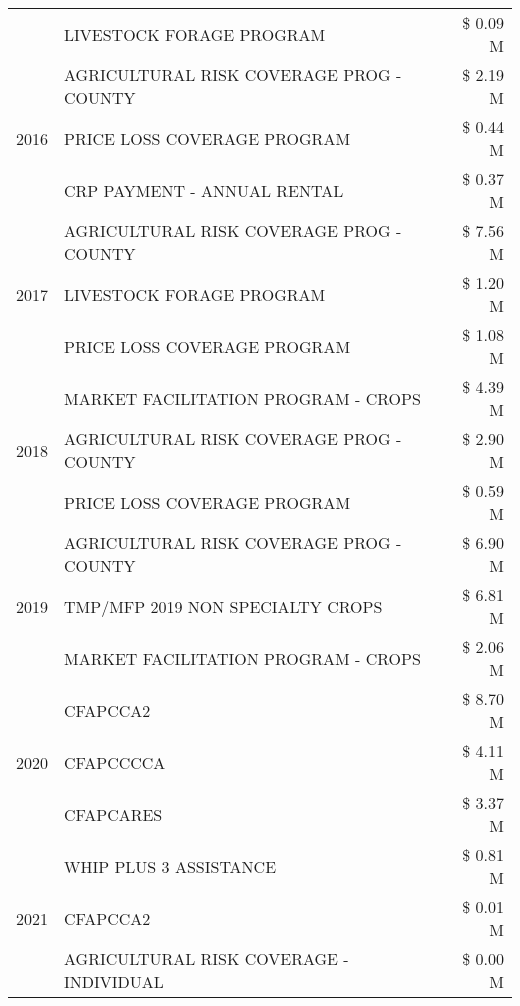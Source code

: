 \begin{tabular}{llr}
 & LIVESTOCK FORAGE PROGRAM & \$ 0.09 M \\
\cline{1-3}
\multirow[t]{3}{*}{2016} & AGRICULTURAL RISK COVERAGE PROG - COUNTY & \$ 2.19 M \\
 & PRICE LOSS COVERAGE PROGRAM & \$ 0.44 M \\
 & CRP PAYMENT - ANNUAL RENTAL & \$ 0.37 M \\
\cline{1-3}
\multirow[t]{3}{*}{2017} & AGRICULTURAL RISK COVERAGE PROG - COUNTY & \$ 7.56 M \\
 & LIVESTOCK FORAGE PROGRAM & \$ 1.20 M \\
 & PRICE LOSS COVERAGE PROGRAM & \$ 1.08 M \\
\cline{1-3}
\multirow[t]{3}{*}{2018} & MARKET FACILITATION PROGRAM - CROPS & \$ 4.39 M \\
 & AGRICULTURAL RISK COVERAGE PROG - COUNTY & \$ 2.90 M \\
 & PRICE LOSS COVERAGE PROGRAM & \$ 0.59 M \\
\cline{1-3}
\multirow[t]{3}{*}{2019} & AGRICULTURAL RISK COVERAGE PROG - COUNTY & \$ 6.90 M \\
 & TMP/MFP 2019 NON SPECIALTY CROPS & \$ 6.81 M \\
 & MARKET FACILITATION PROGRAM - CROPS & \$ 2.06 M \\
\cline{1-3}
\multirow[t]{3}{*}{2020} & CFAPCCA2 & \$ 8.70 M \\
 & CFAPCCCCA & \$ 4.11 M \\
 & CFAPCARES & \$ 3.37 M \\
\cline{1-3}
\multirow[t]{3}{*}{2021} & WHIP PLUS 3 ASSISTANCE & \$ 0.81 M \\
 & CFAPCCA2 & \$ 0.01 M \\
 & AGRICULTURAL RISK COVERAGE - INDIVIDUAL & \$ 0.00 M \\
\cline{1-3}
\bottomrule
\end{tabular}
